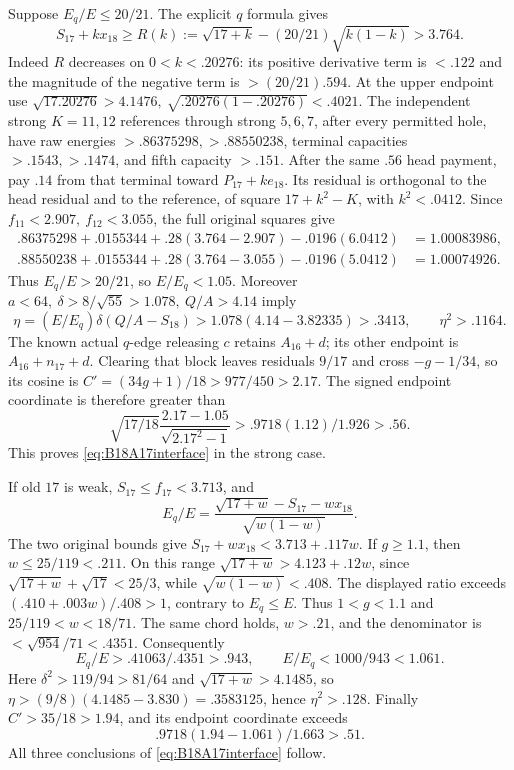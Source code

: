 \documentclass[11pt]{article}
\theoremstyle{definition}
\theoremstyle{remark}
\begin{document}
Suppose \(E_q/E\leq20/21\).
The explicit \(q\) formula gives
\[
 S_{17}+kx_{18}\geq
 R(k):=\sqrt{17+k}-(20/21)\sqrt{k(1-k)}>3.764 .
\]
Indeed \(R\) decreases on \(0<k<.20276\): its positive derivative
term is \(<.122\) and the magnitude of the negative term is
\(>(20/21).594\). At the upper endpoint use
\(\sqrt{17.20276}>4.1476,\allowbreak \ \sqrt{.20276(1-.20276)}<.4021\).
The independent strong \(K=11,\allowbreak 12\) references through strong \(5,\allowbreak 6,\allowbreak 7\),
after every permitted hole, have raw energies
\(>.86375298,\allowbreak >.88550238\), terminal capacities \(>.1543,\allowbreak >.1474\),
and fifth capacity \(>.151\).
After the same \(.56\) head payment, pay \(.14\) from that terminal
toward \(P_{17}+ke_{18}\).
Its residual is orthogonal to the head residual and to the reference,
of square \(17+k^2-K\), with \(k^2<.0412\). Since
\(f_{11}<2.907,\allowbreak \ f_{12}<3.055\), the full original squares give
\[
\begin{split}
 .86375298+.0155344+.28(3.764-2.907)-.0196(6.0412)
 &=1.00083986,\\
 .88550238+.0155344+.28(3.764-3.055)-.0196(5.0412)
 &=1.00074926 .
\end{split}
\]
Thus \(E_q/E>20/21\), so \(E/E_q<1.05\).
Moreover \(a<64,\ \delta>8/\sqrt{55}>1.078,\ Q/A>4.14\) imply
\[
 \eta=(E/E_q)\delta(Q/A-S_{18})
 >1.078(4.14-3.82335)>.3413,\qquad \eta^2>.1164 .
\]
The known actual \(q\)-edge releasing \(c\) retains \(A_{16}+d\);
its other endpoint is \(A_{16}+n_{17}+d\). Clearing that block
leaves residuals \(9/17\) and cross \(-g-1/34\), so its cosine is
\(C'=(34g+1)/18>977/450>2.17\).
The signed endpoint coordinate is therefore greater than
\[
 \sqrt{17/18}\frac{2.17-1.05}{\sqrt{2.17^2-1}}
 >.9718(1.12)/1.926>.56 .
\]
This proves \eqref{eq:B18A17interface} in the strong case.

If old \(17\) is weak, \(S_{17}\leq f_{17}<3.713\), and
\[
 E_q/E=\frac{\sqrt{17+w}-S_{17}-wx_{18}}{\sqrt{w(1-w)}}.
\]
The two original bounds give \(S_{17}+wx_{18}<3.713+.117w\).
If \(g\geq1.1\), then \(w\leq25/119<.211\).
On this range \(\sqrt{17+w}>4.123+.12w\), since
\(\sqrt{17+w}+\sqrt{17}<25/3\), while
\(\sqrt{w(1-w)}<.408\). The displayed ratio exceeds
\((.410+.003w)/.408>1\), contrary to \(E_q\leq E\).
Thus \(1<g<1.1\) and \(25/119<w<18/71\).
The same chord holds, \(w>.21\), and the denominator is
\(<\sqrt{954}/71<.4351\).
Consequently
\[
 E_q/E>.41063/.4351>.943,\qquad E/E_q<1000/943<1.061.
\]
Here \(\delta^2>119/94>81/64\) and
\(\sqrt{17+w}>4.1485\), so
\(\eta>(9/8)(4.1485-3.830)=.3583125\), hence \(\eta^2>.128\).
Finally \(C'>35/18>1.94\), and its endpoint coordinate exceeds
\[
 .9718(1.94-1.061)/1.663>.51 .
\]
All three conclusions of \eqref{eq:B18A17interface} follow.
\end{document}
